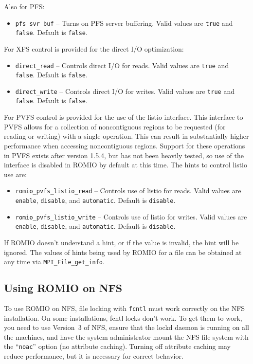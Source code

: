 Also for PFS:
\begin{itemize}
\item \texttt{pfs\_svr\_buf} -- Turns on PFS server buffering.  Valid
values are \texttt{true} and \texttt{false}.  Default is \texttt{false}.
\end{itemize}

For XFS control is provided for the direct I/O optimization:
\begin{itemize}
\item \texttt{direct\_read} -- Controls direct I/O for reads.  Valid
values are \texttt{true} and \texttt{false}.  Default is \texttt{false}.
\item \texttt{direct\_write} -- Controls direct I/O for writes.  Valid
values are \texttt{true} and \texttt{false}.  Default is \texttt{false}.
\end{itemize}

For PVFS control is provided for the use of the listio interface.  This
interface to PVFS allows for a collection of noncontiguous regions to be
requested (for reading or writing) with a single operation.  This can result
in substantially higher performance when accessing noncontiguous regions.
Support for these operations in PVFS exists after version 1.5.4, but has not
been heavily tested, so use of the interface is disabled in ROMIO by default
at this time.  The hints to control listio use are:
\begin{itemize}
\item \texttt{romio\_pvfs\_listio\_read} -- Controls use of listio for reads.
Valid values are \texttt{enable}, \texttt{disable}, and \texttt{automatic}.
Default is \texttt{disable}.
\item \texttt{romio\_pvfs\_listio\_write} -- Controls use of listio for writes.
Valid values are \texttt{enable}, \texttt{disable}, and \texttt{automatic}.
Default is \texttt{disable}.
\end{itemize}

If ROMIO doesn't understand a hint, or if the value is invalid, the hint
will be ignored. The values of hints being used by ROMIO for a file
can be obtained at any time via {\tt MPI\_File\_get\_info}.

\subsection{Using ROMIO on NFS}
To use ROMIO on NFS, file locking with {\tt fcntl} must work correctly
on the NFS installation. On some installations, fcntl locks don't
work.  To get them to work, you need to use Version~3 of NFS, ensure
that the lockd daemon is running on all the machines, and have the system
administrator mount the NFS file system with the ``{\tt noac}'' option
(no attribute caching). Turning off attribute caching may reduce
performance, but it is necessary for correct behavior.

